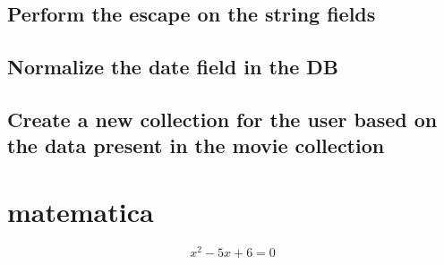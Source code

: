 \begin{alphasection}
\subsection{Perform the escape on the string fields}\label{subsec:theOne}


\subsection{Normalize the date field in the DB}\label{subsec:dateNormalization}


\subsection{Create a new collection for the user based on the data present in the movie collection}\label{subsec:userCreation}


\section{matematica}\label{eq:pippo}
\begin{equation}\label{pippo}
x^2-5x+6=0
\end{equation}
\end{alphasection}

